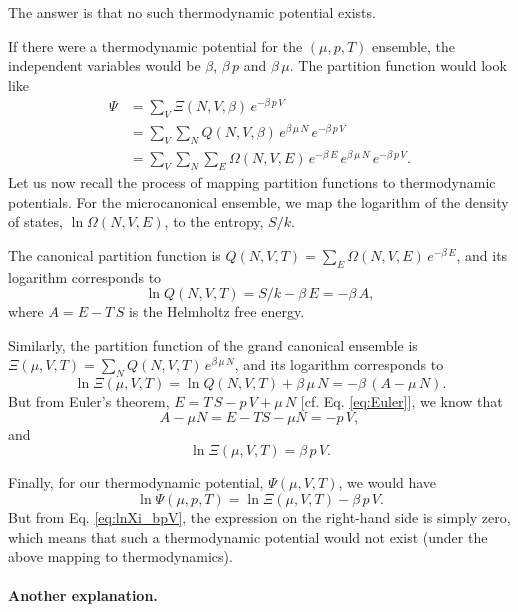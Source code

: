 \documentclass[twocolumn, 10pt]{article}
\numberwithin{equation}{section}
\newenvironment{solution}[1][\empty]
{\par\medskip
  \textbf{\ifx\empty#1{Solution.}\relax\else{#1}\fi} \ignorespaces}
{\medskip}
\begin{document}
\begin{solution}
The answer is that no such thermodynamic potential exists.

If there were a thermodynamic potential for the $(\mu, p, T)$ ensemble,
the independent variables would be $\beta$, $\beta \, p$ and $\beta \, \mu$.
%
The partition function would look like
\begin{align*}
  \Psi
  &=
  \sum_V \Xi(N, V, \beta) \, e^{-\beta \, p \, V}
  \\
  &=
  \sum_V \sum_N Q(N, V, \beta) \, e^{\beta \, \mu \, N} \, e^{-\beta \, p \, V}
  \\
  &=
  \sum_V \sum_N \sum_E \Omega(N, V, E) \, e^{-\beta \, E}
  \, e^{\beta \, \mu \, N} \, e^{-\beta \, p \, V}
  .
\end{align*}
%
Let us now recall the process of mapping
partition functions to thermodynamic potentials.
%
For the microcanonical ensemble,
we map the logarithm of the density of states,
$\ln \Omega(N, V, E)$,
to the entropy, $S/k$.

The canonical partition function is
$Q(N, V, T) = \sum_E \Omega(N, V, E) \, e^{-\beta \, E}$,
and its logarithm corresponds to
$$
\ln Q(N, V, T) = S/k - \beta \, E = -\beta \, A,
$$
where $A = E - T \, S$ is the Helmholtz free energy.

Similarly, the partition function
of the grand canonical ensemble is
$\Xi(\mu, V, T) = \sum_N Q(N, V, T) \, e^{\beta \, \mu \, N}$,
and its logarithm corresponds to
$$
\ln \Xi(\mu, V, T) = \ln Q(N, V, T) + \beta \, \mu \, N = -\beta \, (A - \mu \, N).
$$
But from Euler's theorem, $E = T \, S - p \, V + \mu \, N$
[cf. Eq. \eqref{eq:Euler}], we know that
$$
A - \mu N = E - T S - \mu N = -p \, V,
$$
and
\begin{equation}
  \ln \Xi(\mu, V, T) = \beta \, p \, V.
\label{eq:lnXi_bpV}
\end{equation}

Finally, for our thermodynamic potential, $\Psi(\mu, V, T)$,
we would have
$$
\ln \Psi(\mu, p, T) = \ln \Xi(\mu, V, T) - \beta \, p \, V.
$$
But from Eq. \eqref{eq:lnXi_bpV},
the expression on the right-hand side is simply zero,
which means that such a thermodynamic potential
would not exist (under the above mapping to thermodynamics).
\end{solution}

\paragraph*{Another explanation.}
\end{document}
